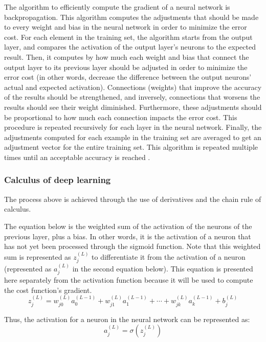 \documentclass[12pt,a4paper,notitlepage]{article}
\begin{document}
The algorithm to efficiently compute the gradient of a neural network is backpropagation. This algorithm computes the adjustments that should be made to every weight and bias in the neural network in order to minimize the error cost. For each element in the training set, the algorithm starts from the output layer, and compares the activation of the output layer's neurons to the expected result. Then, it computes by how much each weight and bias that connect the output layer to its previous layer should be adjusted in order to minimize the error cost (in other words, decrease the difference between the output neurons' actual and expected activation). Connections (weights) that improve the accuracy of the results should be strengthened, and inversely, connections that worsens the results should see their weight diminished. Furthermore, these adjustments should be proportional to how much each connection impacts the error cost. This procedure is repeated recursively for each layer in the neural network. Finally, the adjustments computed for each example in the training set are averaged to get an adjustment vector for the entire training set. This algorithm is repeated multiple times until an acceptable accuracy is reached \cite{sanderson_gradient_2017}.

\subsubsection{Calculus of deep learning}
The process above is achieved through the use of derivatives and the chain rule of calculus.

The equation below is the weighted sum of the activation of the neurons of the previous layer, plus a bias. In other words, it is the activation of a neuron that has not yet been processed through the sigmoid function. Note that this weighted sum is represented as \(z_j^{(L)}\) to differentiate it from the activation of a neuron (represented as \(a_j^{(L)}\) in the second equation below). This equation is presented here separately from the activation function because it will be used to compute the cost function's gradient.
\begin{displaymath}
	z_j^{(L)} = w_{j0}^{(L)}a_0^{(L-1)} + w_{j1}^{(L)}a_1^{(L-1)} + \cdots + w_{jk}^{(L)}a_k^{(L-1)} + b_j^{(L)}
\end{displaymath}

Thus, the activation for a neuron in the neural network can be represented as:
\begin{displaymath}
	a_j^{(L)} = \sigma\left(z_j^{(L)}\right)
\end{displaymath}
\end{document}
